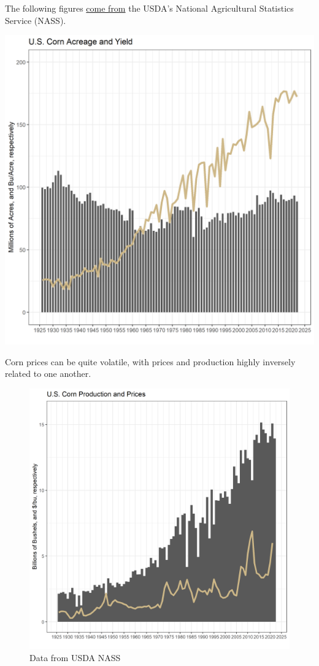 \documentclass[
]{book}
\begin{document}
The following figures \href{http://www.ers.usda.gov/topics/crops/corn/background.aspx}{come from} the USDA's National Agricultural Statistics Service (NASS).

\href{https://quickstats.nass.usda.gov/}{\includegraphics{assets/PrimerforGrain_CornAcandY.png}}

Corn prices can be quite volatile, with prices and production highly inversely related to one another.

\begin{figure}
\centering
\includegraphics{assets/PrimerforGrain_CornProdand$.png}
\caption{Data from USDA NASS}
\end{figure}
\end{document}
